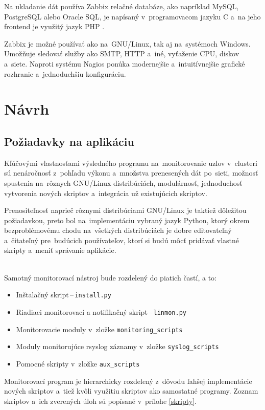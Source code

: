 Na ukladanie dát používa Zabbix relačné databáze, ako napríklad MySQL, PostgreSQL alebo Oracle SQL, je napísaný v~programovacom jazyku C a~na jeho frontend je využitý jazyk PHP \cite{zabbix-doc}.

Zabbix je možné používať ako na~GNU/Linux, tak aj na~systémoch Windows. Umožňuje sledovať služby ako SMTP, HTTP a~iné, vyťaženie CPU, diskov a~siete. Naproti systému Nagios ponúka modernejšie a~intuitívnejšie grafické rozhranie a~jednoduchšiu konfiguráciu. 
\chapter{Návrh}
\label{navrh}
\section{Požiadavky na aplikáciu}
Kľúčovými vlastnosťami výsledného programu na~monitorovanie uzlov v~clusteri sú nenáročnosť z~pohľadu výkonu a~množstva prenesených dát po~sieti, možnosť spustenia na~rôznych GNU/Linux distribúciách, modulárnosť, jednoduchosť vytvorenia nových skriptov a~integrácia už existujúcich skriptov.

Prenositeľnosť naprieč rôznymi distribúciami GNU/Linux je taktiež dôležitou požiadavkou, preto bol na~implementáciu vybraný jazyk \mbox{Python}, ktorý okrem bezproblémovému chodu na~všetkých distribúciách je dobre editovateľný a~čitateľný pre~budúcich používateľov, ktorí si budú môcť pridávať vlastné skripty a~meniť správanie aplikácie.

\noindent
\\
Samotný monitorovací nástroj bude rozdelený do piatich častí, a to:
\begin{itemize}
	\item Inštalačný skript\,--\,\texttt{install.py}
	\item Riadiaci monitorovací a notifikačný skript\,--\,\texttt{linmon.py}
	\item Monitorovacie moduly v~zložke \texttt{monitoring\_scripts}
	\item Moduly monitorujúce rsyslog záznamy v~zložke \texttt{syslog\_scripts}
	\item Pomocné skripty v~zložke \texttt{aux\_scripts} 
\end{itemize}

Monitorovací program je hierarchicky rozdelený z~dôvodu ľahšej implementácie nových skriptov a~tiež kvôli využitiu skriptov ako samostatné programy. Zoznam skriptov a~ich zverených úloh sú popísané v~prílohe \ref{skripty}. 

